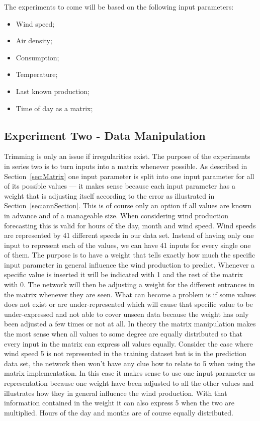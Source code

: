 The experiments to come will be based on the following input parameters:
\begin{itemize}
\item Wind speed;
\item Air density;
\item Consumption;
\item Temperature;
\item Last known production;
\item Time of day as a matrix;
\end{itemize}

\subsection{Experiment Two - Data Manipulation}
Trimming is only an issue if irregularities exist. The purpose of the experiments in series two is to turn inputs into a matrix whenever possible. As described in Section~\ref{sec:Matrix} one input parameter is split into one input parameter for all of its possible values --- it makes sense because each input parameter has a weight that is adjusting itself according to the error as illustrated in Section~\ref{sec:annSection}. This is of course only an option if all values are known in advance and of a manageable size. When considering wind production forecasting this is valid for hours of the day, month and wind speed. Wind speeds are represented  by 41 different speeds in our data set. Instead of having only one input to represent each of the values, we can have 41 inputs for every single one of them. The purpose is to have a weight that tells exactly how much the specific input parameter in general influence the wind production to predict. Whenever a specific value is inserted it will be indicated with 1 and the rest of the matrix with 0. The network will then be adjusting a weight for the different entrances in the matrix whenever they are seen. What can become a problem is if some values does not exist or are under-represented which will cause that specific value to be under-expressed and not able to cover unseen data because the weight has only been adjusted a few times or not at all. In theory the matrix manipulation makes the most sense when all values to some degree are equally distributed so that every input in the matrix can express all values equally. Consider the case where wind speed 5 is not represented in the training dataset but is in the prediction data set, the network then won't have any clue how to relate to 5 when using the matrix implementation. In this case it makes sense to use one input parameter as representation because one weight have been adjusted to all the other values and illustrates how they in general influence the wind production. With that information contained in the weight it can also express 5 when the two are multiplied. Hours of the day and months are of course equally distributed. 

